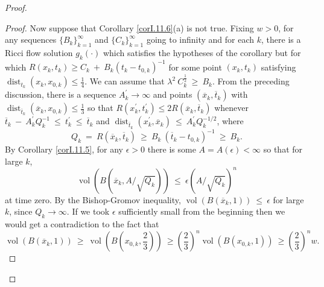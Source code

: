 \documentclass[12pt]{amsart}
\newcommand{\dist}{\operatorname{dist}}
\newcommand{\vol}{\operatorname{vol}}
\numberwithin{equation}{section}
\theoremstyle{plain}
\theoremstyle{definition}
\theoremstyle{remark}
\begin{document}
\begin{proof}
\begin{proof}
Now suppose that Corollary \ref{corI.11.6}(a) is not true. 
Fixing $w > 0$, 
for any sequences $\{B_k\}_{k=1}^\infty$ and $\{C_k\}_{k=1}^\infty$
going to infinity and
for each $k$, there is a Ricci flow solution $g_k(\cdot)$
which satisfies the hypotheses of
the corollary but for which $R(x_k,t_k) \ge C_k \: + \: B_k (t_k - t_{0,k})^{-1}$
for some point $(x_k, t_k)$ satisfying $\dist_{t_k}(x_k, x_{0,k}) \le \frac14$.
We can assume that $\lambda^2 \: C_k^{\frac12} \: \ge \: B_k$.
From the preceding discussion, there is a sequence $A^\prime_k \rightarrow
\infty$ and points $(\overline{x}_k, \overline{t}_k)$ 
with $\dist_{\overline{t}_k}(\overline{x}_k, {x}_{0,k}) \le \frac13$ so that
$R(x_k^\prime, t_k^\prime) \le 2
R(\overline{x}_k, \overline{t}_k)$ whenever
$\overline{t}_k \: - \: A_k^\prime
Q_k^{-1} \: \le \: t_k^\prime \: \le \: \overline{t}_k$ and
$\dist_{\overline{t}_k}(x_k^\prime, \overline{x}_k) \: \le \: A_k^\prime
Q_k^{-1/2}$, where 
\begin{equation}
Q_k \: = \: R(\overline{x}_k, \overline{t}_k) \: \ge \:
B_k \: (\overline{t}_k - t_{0,k})^{-1} \: \ge \: B_k.
\end{equation}
By Corollary \ref{corI.11.5}, for any $\epsilon > 0$ there is some 
$A = A(\epsilon)< \infty$
so that for large $k$,
\begin{equation}
\vol(B(\overline{x}_k, A/\sqrt{Q_k})) \: \le \: \epsilon
(A/\sqrt{Q_k})^n
\end{equation}
at time zero. By the Bishop-Gromov inequality, 
$\vol(B(\overline{x}_k, 1)) \: \le \: \epsilon$ for large $k$, since
$Q_k \rightarrow \infty$.
If we took $\epsilon$ sufficiently small from the beginning then we 
would get a contradiction to the fact that
\begin{equation}
\vol(B(\overline{x}_k, 1)) \: \ge \: \vol \left( B \left( x_{0,k}, \frac23 \right) \right) \: \ge 
\left( \frac23 \right)^n \vol(B(x_{0,k}, 1)) \: \ge \left( \frac23 \right)^n w.
\end{equation}



\end{proof}
\end{proof}
\end{document}
